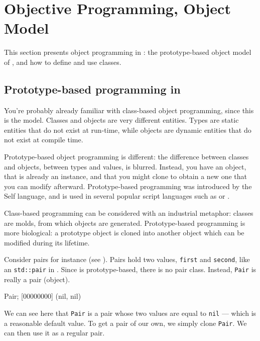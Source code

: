 
\chapter{Objective Programming, \us Object Model}
\label{sec:tut:object}

This section presents object programming in \us: the prototype-based
object model of \us, and how to define and use classes.

\section{Prototype-based programming in \us}

You're probably already familiar with class-based object programming, since
this is the \Cxx model.  Classes and objects are very different entities.
Types are static entities that do not exist at run-time, while objects are
dynamic entities that do not exist at compile time.

Prototype-based object programming is different: the difference between
classes and objects, between types and values, is blurred. Instead, you have
an object, that is already an instance, and that you might clone to obtain a
new one that you can modify afterward. Prototype-based programming was
introduced by the Self language, and is used in several popular script
languages such as \Io or \Js.

Class-based programming can be considered with an industrial metaphor:
classes are molds, from which objects are generated.  Prototype-based
programming is more biological: a prototype object is cloned into another
object which can be modified during its lifetime.

Consider pairs for instance (see ). Pairs hold two values,
\lstinline|first| and \lstinline|second|, like an \lstinline{std::pair} in
\Cxx. Since \us is prototype-based, there is no pair class. Instead,
\lstinline|Pair| is really a pair (object).

\begin{urbiscript}[firstnumber=1]
Pair;
[00000000] (nil, nil)
\end{urbiscript}

We can see here that \lstinline|Pair| is a pair whose two values are equal
to \lstinline|nil| --- which is a reasonable default value. To get a pair of
our own, we simply clone \lstinline|Pair|.  We can then use it as a regular
pair.

